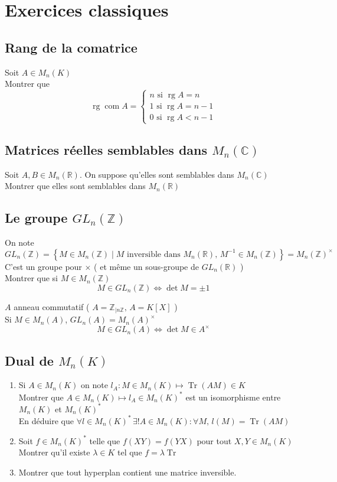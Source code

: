 \documentclass[10pt,a4paper]{article}
\theoremstyle{definition}
\DeclareMathOperator{\com}{com}
\DeclareMathOperator{\rg}{rg}
\DeclareMathOperator{\Tr}{Tr}
\begin{document}
\section{Exercices classiques}
\subsection{Rang de la comatrice}
\noindent Soit $A \in M_n(K)$ \\
Montrer que 
\[ \rg \com A = \begin{cases}
n \text{ si } \rg A = n \\
1 \text{ si } \rg A = n - 1 \\
0 \text{ si } \rg A < n - 1
\end{cases} \]

\subsection{Matrices réelles semblables dans $M_n(\mathbb{C})$}
\noindent Soit $A, B \in M_n(\mathbb{R})$. On suppose qu'elles sont semblables dans $M_n(\mathbb{C})$ \\
Montrer que elles sont semblables dans $M_n(\mathbb{R})$

\subsection{Le groupe $GL_n(\mathbb{Z})$}
\noindent On note $GL_n(\mathbb{Z}) = \left\{ M \in M_n(\mathbb{Z}) \mid M \text{ inversible dans } M_n(\mathbb{R}),\, M^{-1} \in M_n(\mathbb{Z}) \right\} = M_n(\mathbb{Z})^\times $ \\
C'est un groupe pour $\times$ ( et même un sous-groupe de $GL_n(\mathbb{R})$ ) \\
Montrer que si $M \in M_n(\mathbb{Z})$
\[ M \in GL_n(\mathbb{Z}) \iff \det M = \pm 1 \]
\medskip

\noindent $A$ anneau commutatif ( $A = \mathbb{Z}_{|n\mathbb{Z}},\, A = K[X]$ ) \\
Si $M \in M_n(A)$, $GL_n(A) = M_n(A)^\times$
\[ M \in GL_n(A) \iff \det M \in A^\times \]

\subsection{Dual de $M_n(K)$}
\begin{enumerate}
\item Si $A \in M_n(K)$ on note $l_A : M \in M_n(K) \mapsto \Tr(AM) \in K$ \\
Montrer que $A \in M_n(K) \mapsto l_A \in M_n(K)^*$ est un isomorphisme entre $M_n(K)$ et $M_n(K)^*$ \\
En déduire que $\forall l \in M_n(K)^* \, \exists! A \in M_n(K) : \forall M,\, l(M) = \Tr(AM) $
\item Soit $f \in M_n(K)^*$ telle que $f(XY) = f(YX)$ pour tout $X, Y \in M_n(K)$ \\
Montrer qu'il existe $\lambda \in K$ tel que $f = \lambda \Tr$
\item Montrer que tout hyperplan contient une matrice inversible.
\end{enumerate}
\end{document}
